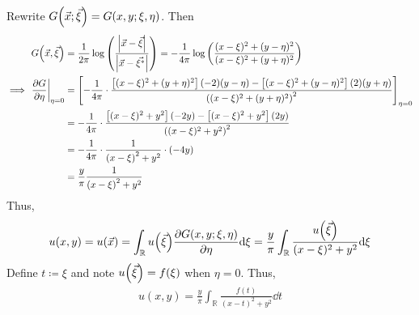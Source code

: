 \documentclass{article} %
\theoremstyle{plain}
\def\Rl{\mathbb{R}}
\begin{document}
\begin{enumerate}[\it (a)]
        Rewrite $G\qty(\vec{x}; \vec{\xi}) = G\qty(x,y;\xi,\eta)$.  Then
        \begin{align*}
            G\qty(\vec{x}, \vec{\xi}) &= \frac{1}{2\pi}\log\qty(\frac{\left|\vec{x} - \vec{\xi}\right|}{\left|\vec{x} - \vec{\xi^*}\right|}) = -\frac{1}{4\pi}\log\qty(\frac{(x - \xi)^2 + (y - \eta)^2}{(x - \xi)^2 + (y + \eta)^2}) \\
            \implies \left.\frac{\partial G}{\partial \eta}\right|_{\eta = 0} &= \qty[-\frac{1}{4\pi}\cdot\frac{\qty[(x - \xi)^2 + (y + \eta)^2](-2)(y - \eta) - \qty[(x - \xi)^2 + (y - \eta)^2](2)(y + \eta)}{\qty((x - \xi)^2 + (y + \eta)^2)^2}]_{\eta = 0} \\
            &= -\frac{1}{4\pi}\cdot\frac{\qty[(x - \xi)^2 + y^2](-2y) - \qty[(x - \xi)^2 + y^2](2y)}{\qty((x - \xi)^2 + y^2)^2} \\
            &= -\frac{1}{4\pi}\cdot\frac{1}{\qty(x - \xi)^2 + y^2}\cdot(-4y) \\
            &= \frac{y}{\pi}\frac{1}{\qty(x - \xi)^2 + y^2}
        \end{align*}
        Thus,
        \begin{align*}
            u(x,y) = u\qty(\vec{x}) = \int_\Rl u\qty(\vec{\xi})\frac{\partial G(x,y;\xi,\eta)}{\partial \eta}\dd \xi = \frac{y}{\pi}\int_\Rl \frac{u\qty(\vec{\xi})}{(x - \xi)^2 + y^2}\dd \xi
        \end{align*}
        Define $t \coloneqq \xi$ and note $u\qty(\vec{\xi}) = f\qty(\xi)$ when $\eta = 0$.  Thus,
        \begin{align*}
            \boxed{u(x,y) = \frac{y}{\pi}\int_\Rl \frac{f(t)}{(x-t)^2 + y^2}\dd t}
        \end{align*}
\end{enumerate}
\end{document}
